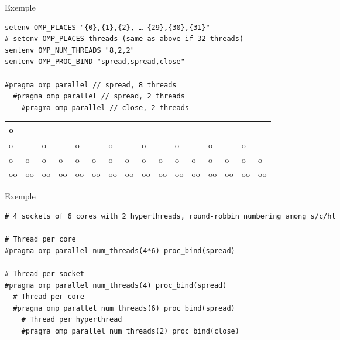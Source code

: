 \documentclass[10pt]{beamer}
\begin{document}
\begin{frame}[fragile]{Exemple}

  \begin{verbatim}
setenv OMP_PLACES "{0},{1},{2}, … {29},{30},{31}"
# setenv OMP_PLACES threads (same as above if 32 threads)
sentenv OMP_NUM_THREADS "8,2,2"
sentenv OMP_PROC_BIND "spread,spread,close"

#pragma omp parallel // spread, 8 threads
  #pragma omp parallel // spread, 2 threads
    #pragma omp parallel // close, 2 threads
  \end{verbatim}
  \tiny
  \begin{tabular}{|l|l|l|l|l|l|l|l|l|l|l|l|l|l|l|l|}
  \hline
  \multicolumn{16}{|l|}{o} \\ \hline
  \multicolumn{2}{|l|}{o} &
  \multicolumn{2}{|l|}{o} &
  \multicolumn{2}{|l|}{o} &
  \multicolumn{2}{|l|}{o} &
  \multicolumn{2}{|l|}{o} &
  \multicolumn{2}{|l|}{o} &
  \multicolumn{2}{|l|}{o} &
  \multicolumn{2}{|l|}{o} \\ \hline
  o & o & o & o & o & o & o & o & o & o & o & o & o & o & o & o \\
  \hline
  oo & oo & oo & oo & oo & oo & oo & oo & oo & oo & oo & oo & oo & oo & oo & oo \\
  \hline
  \end{tabular}
\end{frame}


\begin{frame}[fragile]{Exemple}

  \scriptsize
  \begin{verbatim}
# 4 sockets of 6 cores with 2 hyperthreads, round-robbin numbering among s/c/ht

# Thread per core
#pragma omp parallel num_threads(4*6) proc_bind(spread)

# Thread per socket
#pragma omp parallel num_threads(4) proc_bind(spread)
  # Thread per core
  #pragma omp parallel num_threads(6) proc_bind(spread)
    # Thread per hyperthread
    #pragma omp parallel num_threads(2) proc_bind(close)
  \end{verbatim}
\end{frame}
\end{document}
